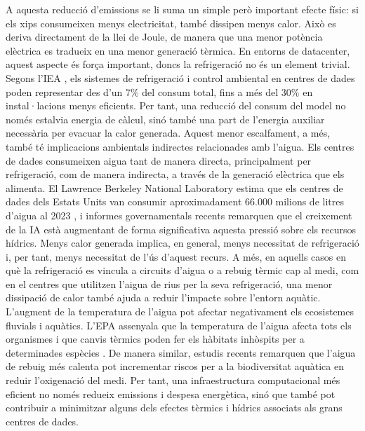\documentclass[a4paper,11pt, titlepage, twoside]{article}
\begin{document}
A aquesta reducció d’emissions se li suma un simple però important efecte físic: si els xips consumeixen menys electricitat, també dissipen menys calor. Això es deriva directament de la llei de Joule, de manera que una menor potència elèctrica es tradueix en una menor generació tèrmica. En entorns de datacenter, aquest aspecte és força important, doncs la refrigeració no és un element trivial. Segons l’IEA \cite{iea_energy_ai_2025}, els sistemes de refrigeració i control ambiental en centres de dades poden representar des d’un 7\% del consum total, fins a més del 30\% en instal·lacions menys eficients. Per tant, una reducció del consum del model no només estalvia energia de càlcul, sinó també una part de l’energia auxiliar necessària per evacuar la calor generada. Aquest menor escalfament, a més, també té implicacions ambientals indirectes relacionades amb l’aigua. Els centres de dades consumeixen aigua tant de manera directa, principalment per refrigeració, com de manera indirecta, a través de la generació elèctrica que els alimenta. El Lawrence Berkeley National Laboratory estima que els centres de dades dels Estats Units van consumir aproximadament 66.000 milions de litres d’aigua al 2023 \cite{shehabi2024datacenter}, i informes governamentals recents remarquen que el creixement de la IA està augmentant de forma significativa aquesta pressió sobre els recursos hídrics. Menys calor generada implica, en general, menys necessitat de refrigeració i, per tant, menys necessitat de l'ús d'aquest recurs. A més, en aquells casos en què la refrigeració es vincula a circuits d’aigua o a rebuig tèrmic cap al medi, com en el centres que utilitzen l'aigua de rius per la seva refrigeració, una menor dissipació de calor també ajuda a reduir l’impacte sobre l’entorn aquàtic. L’augment de la temperatura de l’aigua pot afectar negativament els ecosistemes fluvials i aquàtics. L’EPA assenyala que la temperatura de l’aigua afecta tots els organismes i que canvis tèrmics poden fer els hàbitats inhòspits per a determinades espècies \cite{epa_stream_temperature_2001}. De manera similar, estudis recents remarquen que l’aigua de rebuig més calenta pot incrementar riscos per a la biodiversitat aquàtica en reduir l’oxigenació del medi. Per tant, una infraestructura computacional més eficient no només redueix emissions i despesa energètica, sinó que també pot contribuir a minimitzar alguns dels efectes tèrmics i hídrics associats als grans centres de dades.
\end{document}
